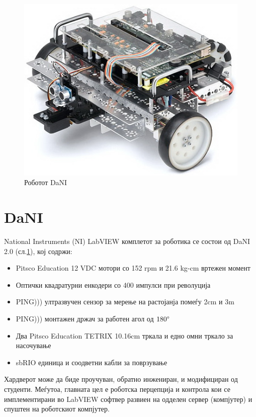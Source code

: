 \documentclass{article}
\begin{document}
\begin{figure}[H]
\includegraphics[width=0.75\linewidth]{dani_isometric.jpg}
\centering
\caption{Роботот DaNI}
\label{fig:dani_isometric.jpg}
\end{figure} 

\newpage

\section{DaNI}
National Instruments (NI) LabVIEW комплетот за роботика се состои од DaNI 2.0 (сл.\ref{fig:dani_isometric.jpg}), кој содржи:

\begin{itemize}
	\item Pitsco Education 12 VDC мотори со 152 rpm и 21.6 kg-cm вртежен момент
	\item Оптички квадратурни енкодери со 400 импулси при револуција
	\item PING))) ултразвучен сензор за мерење на растојанја помеѓу 2cm и 3m
	\item PING))) монтажен држач за работен агол од $180 \degree$
	\item Два Pitsco Education TETRIX 10.16cm тркала и едно омни тркало за насочување
	\item sbRIO единица и соодветни кабли за поврзување
\end{itemize}

Хардверот може да биде проучуван, обратно инжениран, и модифициран од студенти. Меѓутоа, главната цел е роботска перцепција и контрола кои се имплементирани во LabVIEW софтвер развиен на одделен сервер (компјутер) и спуштен на роботскиот компјутер.
\end{document}
